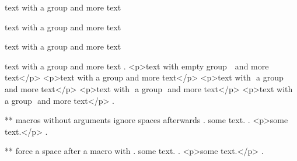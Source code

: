 text with {a group} and more text

text with { a group } and more text

text with { a group  } and more text

text with {  a group  }  and more text
.
<p>text with empty group ​ ​ and more text</p>
<p>text with a group​ and more text</p>
<p>text with ​ a group ​ and more text</p>
<p>text with ​ a group ​ and more text</p>
<p>text with ​ a group ​ and more text</p>
.

** macros without arguments ignore spaces afterwards
.
some \echo  text.
.
<p>some text.</p>
.

** force a space after a macro with {}
.
some \echo{} text.
.
<p>some ​ text.</p>
.
